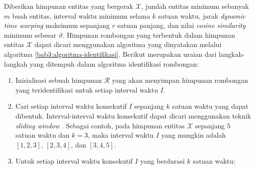 Diberikan himpunan entitas yang bergerak $\mathcal{X}$, jumlah entitas minimum sebanyak $m$ buah entitas, interval waktu minimum selama $k$ satuan waktu, jarak \textit{dynamic time warping} maksimum sepanjang $r$ satuan panjang, dan nilai \textit{cosine similarity} minimum sebesar $\vartheta$. Himpunan rombongan yang terbentuk dalam himpunan entitas $\mathcal{X}$ dapat dicari menggunakan algoritma yang dinyatakan melalui algoritma \ref{bab3:algoritma-identifikasi}. Berikut merupakan uraian dari langkah-langkah yang ditempuh dalam algoritma identifikasi rombongan:

\begin{enumerate}
    \item Inisialisasi sebuah himpunan $\mathcal{R}$ yang akan menyimpan himpunan rombongan yang teridentifikasi untuk setiap interval waktu $I$.
    \item Cari setiap interval waktu konsekutif $I$ sepanjang $k$ satuan waktu yang dapat dibentuk. Interval-interval waktu konsekutif dapat dicari menggunakan teknik \textit{sliding window} \cite{ralf:03:sliding-window}. Sebagai contoh, pada himpunan entitas $\mathcal{X}$ sepanjang $5$ satuan waktu dan $k = 3$, maka interval waktu $I$ yang mungkin adalah $[1, 2, 3]$, $[2, 3, 4]$, dan $[3, 4, 5]$.
    \item Untuk setiap interval waktu konsekutif $I$ yang berdurasi $k$ satuan waktu:
    

\end{enumerate}
